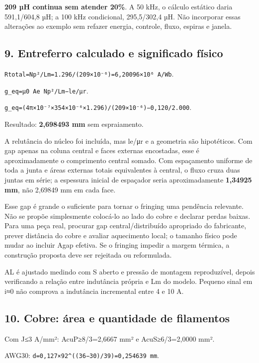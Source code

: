 \documentclass[
]{article}
\begin{document}
\textbf{209 µH continua sem atender 20\%}. A 50 kHz, o cálculo estático
daria 591,1/604,8 µH; a 100 kHz condicional, 295,5/302,4 µH. Não
incorporar essas alterações ao exemplo sem refazer energia, controle,
fluxo, espiras e janela.

\subsection{9. Entreferro calculado e significado
físico}\label{entreferro-calculado-e-significado-fuxedsico}

\texttt{Rtotal=Np²/Lm=1.296/(209×10⁻⁶)=6,20096×10⁶\ A/Wb}.

\texttt{g\_eq=μ0\ Ae\ Np²/Lm−le/μr}.

\texttt{g\_eq=(4π×10⁻⁷×354×10⁻⁶×1.296)/(209×10⁻⁶)−0,120/2.000}.

Resultado: \textbf{2,698493 mm} sem espraiamento.

A relutância do núcleo foi incluída, mas le/μr e a geometria são
hipotéticos. Com gap apenas na coluna central e faces externas
encostadas, esse é aproximadamente o comprimento central somado. Com
espaçamento uniforme de toda a junta e áreas externas totais
equivalentes à central, o fluxo cruza duas juntas em série; a espessura
inicial de espaçador seria aproximadamente \textbf{1,34925 mm}, não
2,69849 mm em cada face.

Esse gap é grande o suficiente para tornar o fringing uma pendência
relevante. Não se propõe simplesmente colocá-lo ao lado do cobre e
declarar perdas baixas. Para uma peça real, procurar gap
central/distribuído apropriado do fabricante, prever distância do cobre
e avaliar aquecimento local; o tamanho físico pode mudar ao incluir Agap
efetiva. Se o fringing impedir a margem térmica, a construção proposta
deve ser rejeitada ou reformulada.

AL é ajustado medindo com S aberto e pressão de montagem reproduzível,
depois verificando a relação entre indutância própria e Lm do modelo.
Pequeno sinal em i≈0 não comprova a indutância incremental entre 4 e 10
A.

\subsection{10. Cobre: área e quantidade de
filamentos}\label{cobre-uxe1rea-e-quantidade-de-filamentos}

Com J≤3 A/mm²: AcuP≥8/3=2,6667 mm² e AcuS≥6/3=2,0000 mm².

AWG30: \texttt{d=0,127×92\^{}((36−30)/39)=0,254639\ mm}.
\end{document}
